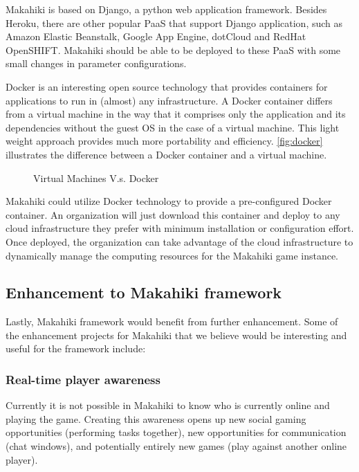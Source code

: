 Makahiki is based on Django, a python web application framework. Besides Heroku, there are other popular PaaS that support Django application, such as Amazon Elastic Beanstalk, Google App Engine, dotCloud and RedHat OpenSHIFT. Makahiki should be able to be deployed to these PaaS with some small changes in parameter configurations. 

Docker \cite{docker} is an interesting open source technology that provides containers for applications to run in (almost) any infrastructure. A Docker container differs from a virtual machine in the way that it comprises only the application and its dependencies without the guest OS in the case of a virtual machine. This light weight approach provides much more portability and efficiency. \autoref{fig:docker} illustrates the difference between a Docker container and a virtual machine.

\begin{figure}[ht!]
	\centering
		\caption{Virtual Machines V.s. Docker \cite {docker}}
		\label{fig:docker}
\end{figure}

Makahiki could utilize Docker technology to provide a pre-configured Docker container. An organization will just download this container and deploy to any cloud infrastructure they prefer with minimum installation or configuration effort. Once deployed, the organization can take advantage of the cloud infrastructure to dynamically manage the computing resources for the Makahiki game instance.

\subsection{Enhancement to Makahiki framework}
Lastly, Makahiki framework would benefit from further enhancement. Some of the enhancement projects for Makahiki that we believe would be interesting and useful for the framework include:

\subsubsection{Real-time player awareness}
Currently it is not possible in Makahiki to know who is currently online and playing the game. Creating this awareness opens up new social gaming opportunities (performing tasks together), new opportunities for communication (chat windows), and potentially entirely new games (play against another online player). 

